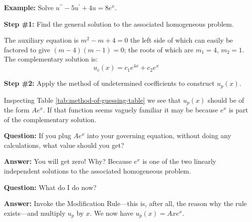\vspace{0.5cm}

\noindent\textbf{Example:} Solve $u^{\prime \prime}-5u^{\prime}+4u=8e^x$.

\vspace{0.25cm}

\noindent\textbf{Step \#1:} Find the general solution to the associated homogeneous problem.

\vspace{0.25cm}

\noindent The auxiliary equation is $m^2-m+4=0$ the left side of which can easily be factored to give $(m-4)(m-1)=0$; the roots of which are $m_1=4$, $m_2=1$.  The complementary solution is:
\begin{equation*}
u_c(x) = c_1e^{4x}+c_2e^{x}
\end{equation*} 

\vspace{3.0cm}

\noindent\textbf{Step \#2:} Apply the method of undetermined coefficients to construct $u_p(x)$.

\vspace{0.25cm}

\noindent Inspecting Table \ref{tab:method-of-guessing-table} we see that $u_p(x)$ should be of the form $Ae^{x}$.  If that function seems vaguely familiar it may be because $e^x$ is part of the complementary solution. 

\vspace{0.25cm}

\noindent\textbf{Question:} If you plug $Ae^{x}$ into your governing equation, without doing any calculations, what value should you get?

\vspace{0.25cm}

\noindent\textbf{Answer:} You will get zero!  Why? Because $e^{x}$ is one of the two linearly independent solutions to the associated homogeneous problem. 

\vspace{0.25cm}

\noindent\textbf{Question: } What do I do now?

\vspace{0.25cm}

\noindent\textbf{Answer: } Invoke the Modification Rule---this is, after all, the reason why the rule exists---and multiply $u_p$ by $x$.  We now have $u_p(x) = Axe^x$.

\vspace{0.25cm}


